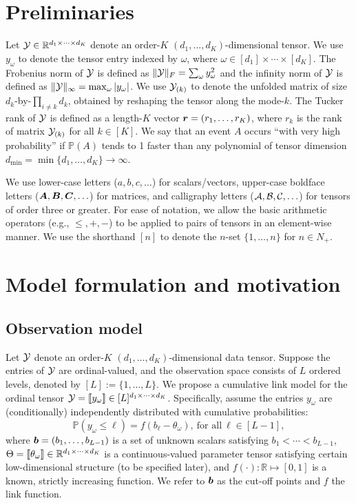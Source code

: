\documentclass[11pt]{article}
\theoremstyle{plain}
\theoremstyle{definition}
\begin{document}
\section{Preliminaries}
Let $\mathcal{Y}\in\mathbb{R}^{d_1\times \cdots \times d_K}$ denote an order-$K$ $(d_1,\ldots,d_K)$-dimensional tensor. We use $y_\omega$ to denote the tensor entry indexed by $\omega$, where $\omega\in[d_1]\times\cdots\times[d_K]$.  The Frobenius norm of $\mathcal{Y}$ is defined as $\lVert\mathcal{Y}\rVert_F=\sum_\omega y^2_\omega$ and the infinity norm of $\mathcal{Y}$ is defined as $\lVert\mathcal{Y}\rVert_\infty=\max_{\omega}|y_\omega|$. We use $\mathcal{Y}_{(k)}$ to denote the unfolded matrix of size $d_k$-by-$\prod_{i\neq k}d_k$, obtained by reshaping the tensor along the mode-$k$. The Tucker rank of $\mathcal{Y}$ is defined as a length-$K$ vector $\bm{r} = (r_1,\ldots,r_K)$, where $r_k$ is the rank of matrix $\mathcal{Y}_{(k)}$ for all $k \in[K]$. We say that an event $A$ occurs ``with very high probability'' if $\mathbb{P}(A)$ tends to 1 faster than any polynomial of tensor dimension $d_{\min}=\min\{d_1,\ldots,d_K\} \to\infty$.

We use lower-case letters ($a, b, c, \ldots$) for scalars/vectors, upper-case boldface letters ($\bm A, \bm B, \bm C, \ldots$) for matrices, and calligraphy letters ($\mathcal{A},\mathcal{B},\mathcal{C},\ldots$) for tensors of order three or greater. For ease of notation, we allow the basic arithmetic operators (e.g., $\leq, +, -$) to be applied to pairs of tensors in an element-wise manner. We use the shorthand $[n]$ to denote the $n$-set $\{1,\ldots,n\}$ for $n \in N_{+}$.

\section{Model formulation and motivation}
\subsection{Observation model}
Let $\mathcal{Y}$ denote an order-$K$ $(d_1,\ldots,d_K)$-dimensional data tensor. Suppose the entries of $\mathcal{Y}$ are ordinal-valued, and the observation space consists of $L$ ordered levels, denoted by $[L]:=\{1,\ldots,L\}$. We propose a cumulative link model for the ordinal tensor $\mathcal{Y}=\llbracket y_\omega \rrbracket\in[L]^{d_1\times \cdots\times d_K}$. Specifically, assume the entries $y_\omega$ are (conditionally) independently distributed with cumulative probabilities:
\begin{equation}\label{eq:model}
\mathbb{P}(y_\omega\leq \ell)=f(b_\ell-\theta_\omega),\ \text{for all}\ \ell\in[L-1],
\end{equation}
where $\bm{b}=(b_1,\ldots,b_{L-1})$ is a set of unknown scalars satisfying $b_1<\cdots <b_{L-1}$, $\Theta=\llbracket \theta_\omega \rrbracket\in\mathbb{R}^{d_1\times \cdots \times d_K}$ is a continuous-valued parameter tensor satisfying certain low-dimensional structure (to be specified later), and $f(\cdot):\mathbb{R}\mapsto[0,1]$ is a known, strictly increasing function. We refer to $\bm{b}$ as the cut-off points and $f$ the link function.
\end{document}
